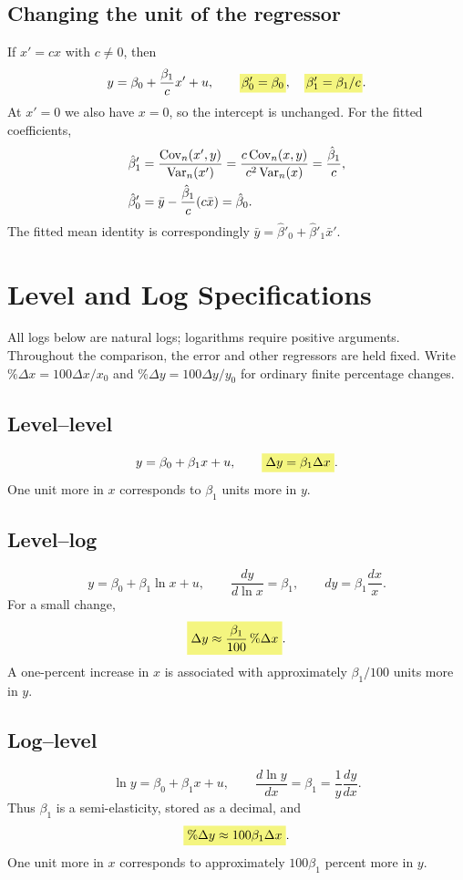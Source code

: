 \subsection{Changing the unit of the regressor}
If $x'=cx$ with $c\ne0$, then
\[y=\beta_0+\frac{\beta_1}{c}x'+u,\qquad
\hy{$\beta'_0=\beta_0$},\quad\hy{$\beta'_1=\beta_1/c$}.\]
At $x'=0$ we also have $x=0$, so the intercept is unchanged. For the fitted coefficients,
\begin{align*}
\hat\beta'_1
 &=\frac{\operatorname{Cov}_n(x',y)}{\operatorname{Var}_n(x')}
 =\frac{c\operatorname{Cov}_n(x,y)}{c^2\operatorname{Var}_n(x)}
 =\frac{\hat\beta_1}{c},\\
\hat\beta'_0&=\bar y-\frac{\hat\beta_1}{c}(c\bar x)=\hat\beta_0.
\end{align*}
The fitted mean identity is correspondingly $\bar y=\hat\beta'_0+\hat\beta'_1\bar x'$.

\section{Level and Log Specifications}
\label{sec:logs}
 All logs below are natural logs; logarithms require positive arguments. Throughout the comparison, the error and other regressors are held fixed. Write $\%\Delta x=100\Delta x/x_0$ and $\%\Delta y=100\Delta y/y_0$ for ordinary finite percentage changes.

\subsection{Level--level}
\[y=\beta_0+\beta_1x+u,\qquad
\hm{\Delta y=\beta_1\Delta x}.\]
One unit more in $x$ corresponds to $\beta_1$ units more in $y$.

\subsection{Level--log}
\[y=\beta_0+\beta_1\ln x+u,\qquad
\frac{dy}{d\ln x}=\beta_1,\qquad
dy=\beta_1\frac{dx}{x}.\]
For a small change,
\[\hm{\Delta y\approx\frac{\beta_1}{100}\,\%\Delta x}.\]
A one-percent increase in $x$ is associated with approximately $\beta_1/100$ units more in $y$.

\subsection{Log--level}
\[\ln y=\beta_0+\beta_1x+u,\qquad
\frac{d\ln y}{dx}=\beta_1=\frac{1}{y}\frac{dy}{dx}.\]
Thus $\beta_1$ is a semi-elasticity, stored as a decimal, and
\[\hm{\%\Delta y\approx100\beta_1\Delta x}.\]
One unit more in $x$ corresponds to approximately $100\beta_1$ percent more in $y$.

